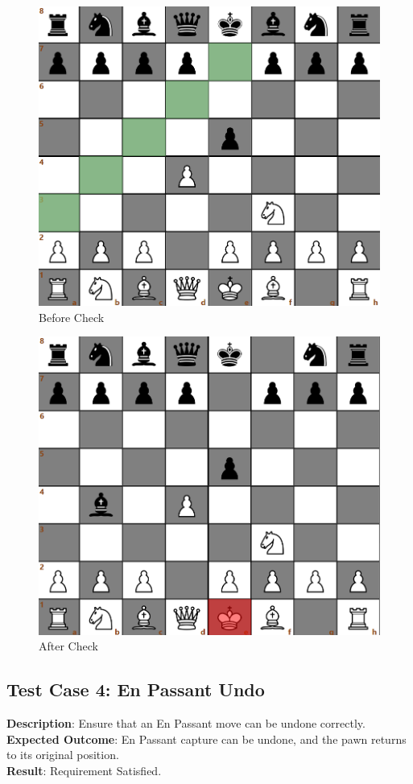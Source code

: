 \documentclass[a4paper,12pt]{article}
\begin{document}
\begin{figure}[H]
    \centering
    \includegraphics[width=0.6\linewidth]{Images/Test Cases/testCase3Img1.png}
    \caption{Before Check}
    \label{fig:BeforeCheck}
\end{figure}

\begin{figure}[H]
    \centering
    \includegraphics[width=0.6\linewidth]{Images/Test Cases/testCase3Img2.png}
    \caption{After Check}
    \label{fig:AfterCheck}
\end{figure}

\subsection{Test Case 4: En Passant Undo}
\textbf{Description}: Ensure that an En Passant move can be undone correctly.\\
\textbf{Expected Outcome}: En Passant capture can be undone, and the pawn returns to its original position.\\
\textbf{Result}: Requirement Satisfied.
\end{document}
